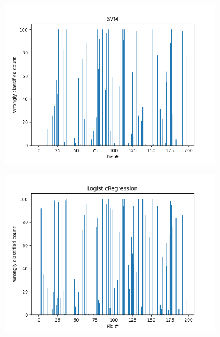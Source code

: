 \documentclass{article}
\begin{document}
\begin{figure}[ht]
\begin{subfigure}{.33\textwidth}
  \centering
  \includegraphics[width=1\linewidth]{1a/SVM.png}  
  
  \label{fig:sub-first}
\end{subfigure}
\begin{subfigure}{.33\textwidth}
  \centering
  \includegraphics[width=1\linewidth]{1a/Logistic regression.png}  
  

\end{subfigure}
\end{figure}
\end{document}
